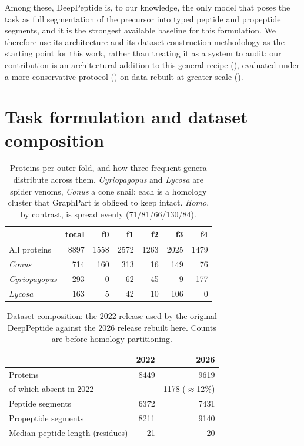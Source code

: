\documentclass{article}
\begin{document}
Among these, DeepPeptide is, to our knowledge, the only model that poses the task as full segmentation of the precursor into typed peptide and propeptide segments, and it is the strongest available baseline for this formulation. We therefore use its architecture and its dataset-construction methodology as the starting point for this work, rather than treating it as a system to audit: our contribution is an architectural addition to this general recipe (), evaluated under a more conservative protocol () on data rebuilt at greater scale ().


\section{Task formulation and dataset composition}
\label{sec:app-problem}

\begin{table}[h]
\centering
\caption{Proteins per outer fold, and how three frequent genera distribute across them. \emph{Cyriopagopus} and \emph{Lycosa} are spider venoms, \emph{Conus} a cone snail; each is a homology cluster that GraphPart is obliged to keep intact. \textit{Homo}, by contrast, is spread evenly (71/81/66/130/84).}
\label{tab:genus}
\small
\begin{tabular}{lrrrrrr}
\toprule
 & \textbf{total} & \textbf{f0} & \textbf{f1} & \textbf{f2} & \textbf{f3} & \textbf{f4} \\
\midrule
All proteins & 8897 & 1558 & 2572 & 1263 & 2025 & 1479 \\
\midrule
\textit{Conus} & 714 & 160 & 313 & 16 & 149 & 76 \\
\textit{Cyriopagopus} & 293 & 0 & 62 & 45 & 9 & 177 \\
\textit{Lycosa} & 163 & 5 & 42 & 10 & 106 & 0 \\
\bottomrule
\end{tabular}
\end{table}

\begin{table}[h]
\centering
\caption{Dataset composition: the 2022 release used by the original DeepPeptide against the 2026 release rebuilt here. Counts are before homology partitioning.}
\label{tab:dataset}
\small
\begin{tabular}{lrr}
\toprule
 & \textbf{2022} & \textbf{2026} \\
\midrule
Proteins & 8449 & 9619 \\
\quad of which absent in 2022 & --- & 1178 ($\approx$12\%) \\
Peptide segments & 6372 & 7431 \\
Propeptide segments & 8211 & 9140 \\
Median peptide length (residues) & 21 & 20 \\
\bottomrule
\end{tabular}
\end{table}
\end{document}
